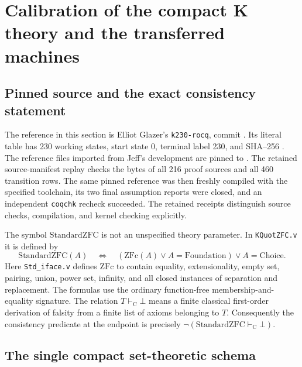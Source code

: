 \section{Calibration of the compact K theory and the transferred machines}
\label{sec:k230-calibration}

\subsection{Pinned source and the exact consistency statement}

The reference in this section is Elliot Glazer's \texttt{k230-rocq}, commit
.
Its literal table has 230 working states, start state 0, terminal label 230,
and SHA--256
.
The reference files imported from Jeff's development are pinned to
.
The retained source-manifest replay checks the bytes of all 216 proof
sources and all 460 transition rows. The same pinned reference was then
freshly compiled with the specified toolchain, its two final assumption
reports were closed, and an independent \texttt{coqchk} recheck succeeded.
The retained receipts distinguish source checks, compilation, and kernel
checking explicitly.

The symbol \(\mathrm{StandardZFC}\) is not an unspecified theory parameter.
In \texttt{KQuotZFC.v} it is defined by
\[
 \mathrm{StandardZFC}(A)\quad\Longleftrightarrow\quad
 (\mathrm{ZFc}(A)\lor A=\mathrm{Foundation})
       \lor A=\mathrm{Choice}.
\]
Here \texttt{Std\_iface.v} defines \(\mathrm{ZFc}\) to contain equality,
extensionality, empty set, pairing, union, power set, infinity, and all closed
instances of separation and replacement. The formulas use the ordinary
function-free membership-and-equality signature. The relation
\(T\vdash_{\mathrm C}\bot\) means a finite classical first-order derivation
of falsity from a finite list of axioms belonging to \(T\).
Consequently the consistency predicate at the endpoint is precisely
\(\neg(\mathrm{StandardZFC}\vdash_{\mathrm C}\bot)\).

\subsection{The single compact set-theoretic schema}

